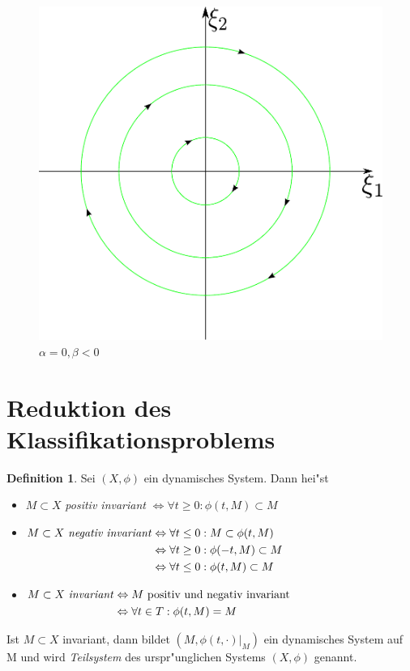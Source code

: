 \documentclass[a4paper, 13pt]{scrreprt}
\theoremstyle{definition} \newtheorem{definition}{Definition}[section]
\begin{document}
\begin{figure}[htpb]
		\includegraphics[height=0.25\textheight]{img/lin_sys/lin_sys_7_3.pdf}
		\caption{$\alpha = 0, \beta < 0$}
	\end{figure}
\newpage
\section{Reduktion des Klassifikationsproblems}
\begin{definition}
	Sei \((X,\phi)\) ein dynamisches System. Dann hei"st
	\begin{itemize}
		\item \( M \subset X \) \emph{positiv invariant} \(\Leftrightarrow  \forall t \geq 0: \phi(t,M) \subset M \)
		\item \(\begin{aligned}[t] M \subset X  \text{ \emph{negativ invariant}} 
			& \Leftrightarrow \forall t \leq 0: M \subset \phi(t,M)  \\
			& \Leftrightarrow \forall t \geq 0: \phi(-t,M) \subset M \\
			& \Leftrightarrow \forall t \leq 0: \phi(t,M) \subset M  
			\end{aligned} \)
			
		\item \(\begin{aligned}[t] M \subset X \text{ \emph{invariant}} & \Leftrightarrow M\ \text{positiv und negativ invariant}\\
			& \Leftrightarrow \forall t \in T: \phi(t,M) = M \ 
			\end{aligned} \)
		\end{itemize}	
		Ist \( M \subset X \) invariant, dann bildet 
			\( (M,\left. \phi(t,\cdot)\right|_M) \) ein dynamisches System auf M und wird \emph{Teilsystem} des urspr"unglichen Systems \((X,\phi)\) genannt. 	
\end{definition}
\end{document}
